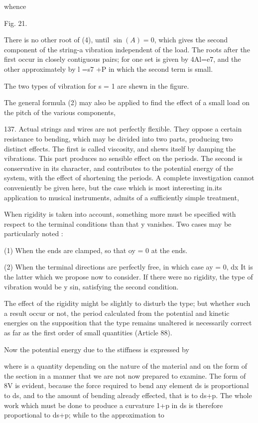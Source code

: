 whence

Fig. 21.

There is no other root of (4), until \(\sin(A)=0\), which gives the second
component of the string-a vibration independent of the load. The roots after
the first occur in closely contiguous pairs; for one set is given by 4Al=e7,
and the other approximately by l =s7 +P in which the second term is small.

The two types of vibration for s = 1 are shewn in the figure.

The general formula (2) may also be applied to find the effect of a small load
on the pitch of the various components,

137. Actual strings and wires are not perfectly flexible. They oppose a certain
resistance to bending, which may be divided into two parts, producing two
distinct effects. The first is called viscosity, and shews itself by damping
the vibrations. This part produces no sensible effect on the periods. The
second is conservative in its character, and contributes to the potential
energy of the system, with the effect of shortening the periods. A complete
investigation cannot conveniently be given here, but the case which is most
interesting in.its application to musical instruments, admits of a sufficiently
simple treatment,

When rigidity is taken into account, something more must be specified with
respect to the terminal conditions than that y vanishes. Two cases may be
particularly noted :

(1) When the ends are clamped, so that oy = 0 at the ends.

(2) When the terminal directions are perfectly free, in which case ay = 0, dx
It is the latter which we propose now to consider. If there were no rigidity,
the type of vibration would be y sin, satisfying the second condition.

The effect of the rigidity might be slightly to disturb the type; but whether
such a result occur or not, the period calculated from the potential and
kinetic energies on the supposition that the type remains unaltered is
necessarily correct as far as the first order of small quantities (Article 88).

Now the potential energy due to the stiffness is expressed by

where is a quantity depending on the nature of the material and on the form of
the section in a manner that we are not now prepared to examine.  The form of
8V is evident, because the force required to bend any element ds is
proportional to ds, and to the amount of bending already effected, that is to
ds+p. The whole work which must be done to produce a curvature 1+p in ds is
therefore proportional to ds+p; while to the approximation to

